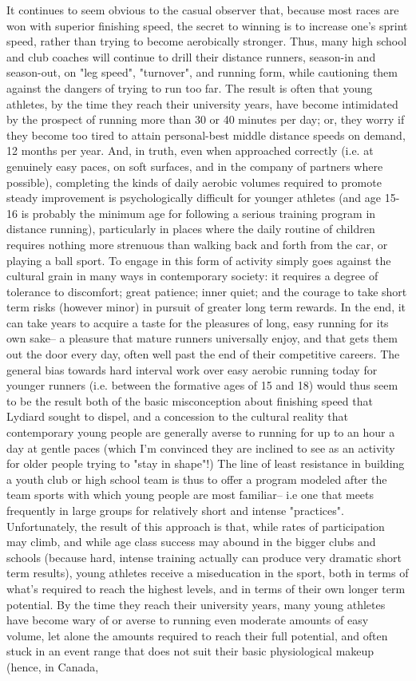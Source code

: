 It continues to seem obvious to the casual observer that, because most races are won with superior finishing speed, the secret to winning is to increase one's sprint speed, rather than trying to become aerobically stronger. Thus, many high school and club coaches will continue to drill their distance runners, season-in and season-out, on "leg speed", "turnover", and running form, while cautioning them against the dangers of trying to run too far. The result is often that young athletes, by the time they reach their university years, have become intimidated by the prospect of running more than 30 or 40 minutes per day; or, they worry if they become too tired to attain personal-best middle distance speeds on demand, 12 months per year. And, in truth, even when approached correctly (i.e. at genuinely easy paces, on soft surfaces, and in the company of partners where possible), completing the kinds of daily aerobic volumes required to promote steady improvement is psychologically difficult for younger athletes (and age 15-16 is probably the minimum age for following a serious training program in distance running), particularly in places where the daily routine of children requires nothing more strenuous than walking back and forth from the car, or playing a ball sport. To engage in this form of activity simply goes against the cultural grain in many ways in contemporary society: it requires a degree of tolerance to discomfort; great patience; inner quiet; and the courage to take short term risks (however minor) in pursuit of greater long term rewards. In the end, it can take years to acquire a taste for the pleasures of long, easy running for its own sake-- a pleasure that mature runners universally enjoy, and that gets them out the door every day, often well past the end of their competitive careers. The general bias towards hard interval work over easy aerobic running today for younger runners (i.e. between the formative ages of 15 and 18) would thus seem to be the result both of the basic misconception about finishing speed that Lydiard sought to dispel, and a concession to the cultural reality that contemporary young people are generally averse to running for up to an hour a day at gentle paces (which I'm convinced they are inclined to see as an activity for older people trying to "stay in shape"!) The line of least resistance in building a youth club or high school team is thus to offer a program modeled after the team sports with which young people are most familiar-- i.e one that meets frequently in large groups for relatively short and intense "practices". Unfortunately, the result of this approach is that, while rates of participation may climb, and while age class success may abound in the bigger clubs and schools (because hard, intense training actually can produce very dramatic short term results), young athletes receive a miseducation in the sport, both in terms of what's required to reach the highest levels, and in terms of their own longer term potential. By the time they reach their university years, many young athletes have become wary of or averse to running even moderate amounts of easy volume, let alone the amounts required to reach their full potential, and often stuck in an event range that does not suit their basic physiological makeup (hence, in Canada, 